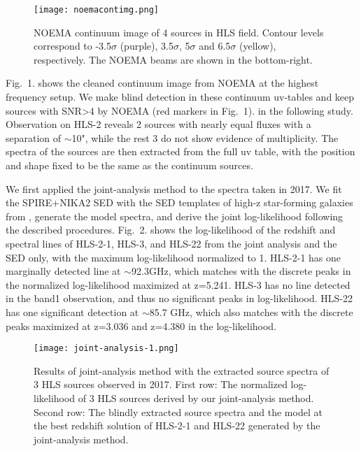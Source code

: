 \documentclass{webofc}
\begin{document}
\begin{figure}[h]
\begin{center}
\texttt{[image: noemacontimg.png]}
\label{contimg}    
\caption{NOEMA continuum image of 4 sources in HLS field. Contour levels correspond to -3.5$\sigma$ (purple), 3.5$\sigma$, 5$\sigma$ and 6.5$\sigma$ (yellow), respectively. The NOEMA beams are shown in the bottom-right. }
\end{center}
\end{figure}
Fig.~1. shows the cleaned continuum image from NOEMA at the highest frequency setup. We make blind detection in these continuum uv-tables and keep sources with SNR>4 by NOEMA (red markers in Fig.~1). in the following study. Observation on HLS-2 reveals 2 sources with nearly equal fluxes with a separation of $\sim$10",  while the rest 3 do not show evidence of multiplicity. The spectra of the sources are then extracted from the full uv table, with the position and shape fixed to be the same as the continuum sources. 

We first applied the joint-analysis method to the spectra taken in 2017. 
We fit the SPIRE+NIKA2 SED with the SED templates of high-z star-forming galaxies from \cite{B15}, generate the model spectra, and derive the joint log-likelihood following the described procedures. Fig.~2. shows the log-likelihood of the redshift and spectral lines of HLS-2-1, HLS-3, and HLS-22 from the joint analysis and the SED only, with the maximum log-likelihood normalized to 1. HLS-2-1 has one marginally detected line at $\sim$92.3GHz, which matches with the discrete peaks in the normalized log-likelihood maximized at z=5.241. HLS-3 has no line detected in the band1 observation, and thus no significant peaks in log-likelihood. HLS-22 has one significant detection at $\sim$85.7 GHz, which also matches with the discrete peaks maximized at z=3.036 and z=4.380 in the log-likelihood. 

\begin{figure}[h]
\begin{center}
\texttt{[image: joint-analysis-1.png]}
\label{joint1}       %
\caption{Results of joint-analysis method with the extracted source spectra of 3 HLS sources observed in 2017. First row: The normalized log-likelihood of 3 HLS sources derived by our joint-analysis method. Second row: The blindly extracted source spectra and the model at the best redshift solution of HLS-2-1 and HLS-22 generated by the joint-analysis method.}
\end{center}
\end{figure}
\end{document}
